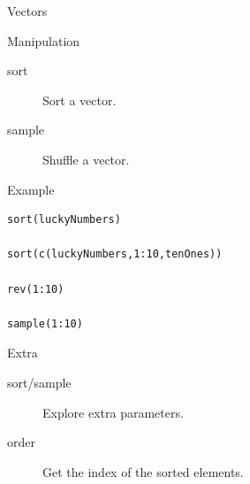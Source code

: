 \documentclass[10pt]{beamer}
\begin{document}
\begin{frame}[fragile,shrink=5]{Vectors}
  \begin{block}{Manipulation}
    \begin{description}
    \item[sort] Sort a {\sf vector}.
    \item[sample] Shuffle a {\sf vector}.
    \end{description}
  \end{block}
  \begin{exampleblock}{Example}
\begin{verbatim}
sort(luckyNumbers)

sort(c(luckyNumbers,1:10,tenOnes))

rev(1:10)

sample(1:10)
\end{verbatim}
  \end{exampleblock}
\begin{alertblock}{Extra}
  \begin{description}
  \item[sort/sample] Explore extra parameters.
  \item[order] Get the index of the sorted elements.
  \end{description}
\end{alertblock}
\end{frame}

\end{document}
